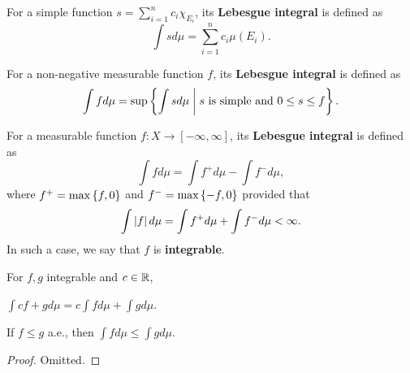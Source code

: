 \begin{definition}
    For a simple function $s = \sum_{i=1}^n c_i\chi_{E_i}$, its 
    \textbf{Lebesgue integral} is defined as
    \begin{equation*}
        \int sd\mu = \sum_{i=1}^n c_i\mu(E_i).
    \end{equation*}
\end{definition}

\begin{definition}
    For a non-negative measurable function $f$, its \textbf{Lebesgue integral} 
    is defined as
    \begin{equation*}
        \int fd\mu = \sup\left\{ \int sd\mu \;\middle\vert\; s\text{ is simple and }0\leq s\leq f \right\}.
    \end{equation*}
\end{definition}

\begin{definition}
    For a measurable function $f:X\to[-\infty,\infty]$, its \textbf{Lebesgue integral} 
    is defined as
    \begin{equation*}
        \int fd\mu = \int f^+d\mu - \int f^-d\mu,
    \end{equation*}
    where $f^+ = \max\left\{ {f,0} \right\}$ and $f^- = \max\left\{ {-f,0} \right\}$ provided that 
    \begin{equation*}
        \int \left\lvert {f} \right\rvert d\mu = \int f^+d\mu + \int f^-d\mu < \infty.
    \end{equation*}
    In such a case, we say that $f$ is \textbf{integrable}.
\end{definition}

\begin{proposition}
    For $f,g$ integrable and $c\in\mathbb{R}$,
    \begin{thmenum}
        \item $\int cf+gd\mu = c\int fd\mu + \int gd\mu$.
        \item If $f\leq g$ a.e., then $\int fd\mu \leq \int gd\mu$.
    \end{thmenum}
\end{proposition}
\begin{proof}
    Omitted.
\end{proof}

